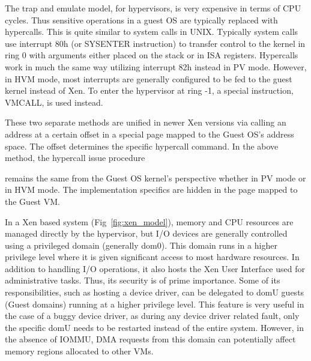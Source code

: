 The trap and emulate model, for hypervisors, is very expensive in terms of CPU cycles. Thus sensitive operations in a guest OS are typically replaced with hypercalls. This is quite similar to system calls in UNIX. Typically system calls use interrupt 80h (or SYSENTER instruction) to transfer control to the kernel in ring 0 with arguments either placed on the stack or in ISA registers. Hypercalls work in much the same way utilizing interrupt 82h instead in PV mode. However, in HVM mode, most interrupts are generally configured to be fed to the guest kernel instead of Xen. To enter the hypervisor at ring -1, a special instruction, VMCALL, is used instead.

These two separate methods are unified in newer Xen versions via calling an address at a certain offset in a special page mapped to the Guest OS's address space. The offset determines the specific hypercall command. In the above method, the hypercall issue procedure

remains the same from the Guest OS kernel's perspective whether in PV mode or in HVM mode. The implementation specifics are hidden in the page mapped to the Guest VM.

In a Xen based system (Fig~\ref{fig:xen_model}), memory and CPU resources are managed directly by the hypervisor, but I/O devices are generally controlled using a privileged domain (generally dom0). This domain runs in a higher privilege level where it is given significant access to most hardware resources. In addition to handling I/O operations, it also hosts the Xen User Interface used for administrative tasks. Thus, its security is of prime importance. Some of its responsibilities, such as hosting a device driver, can be delegated to domU guests (Guest domains) running at a higher privilege level. This feature is very useful in the case of a buggy device driver, as during any device driver related fault, only the specific domU needs to be restarted instead of the entire system. However, in the absence of IOMMU, DMA requests from this domain can potentially affect memory regions allocated to other VMs. 


